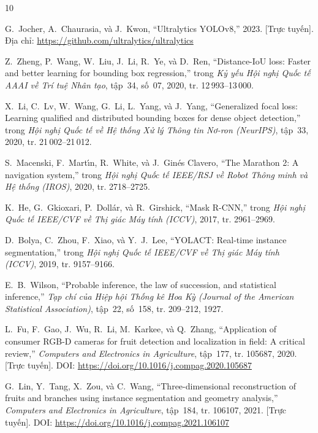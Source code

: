 \documentclass[12pt,a4paper]{article}
\begin{document}
\newpage
\begin{thebibliography}{10}

G.~Jocher, A.~Chaurasia, và J.~Kwon, ``Ultralytics YOLOv8,'' 2023. [Trực tuyến]. Địa chỉ: \url{https://github.com/ultralytics/ultralytics}

Z.~Zheng, P.~Wang, W.~Liu, J.~Li, R.~Ye, và D.~Ren, ``Distance-IoU loss: Faster and better learning for bounding box regression,'' trong \textit{Kỷ yếu Hội nghị Quốc tế AAAI về Trí tuệ Nhân tạo}, tập~34, số~07, 2020, tr. 12\,993--13\,000.

X.~Li, C.~Lv, W.~Wang, G.~Li, L.~Yang, và J.~Yang, ``Generalized focal loss: Learning qualified and distributed bounding boxes for dense object detection,'' trong \textit{Hội nghị Quốc tế về Hệ thống Xử lý Thông tin Nơ-ron (NeurIPS)}, tập~33, 2020, tr. 21\,002--21\,012.

S.~Macenski, F.~Mart{\'\i}n, R.~White, và J.~Gin{\'e}s Clavero, ``The Marathon 2: A navigation system,'' trong \textit{Hội nghị Quốc tế IEEE/RSJ về Robot Thông minh và Hệ thống (IROS)}, 2020, tr. 2718--2725.

K.~He, G.~Gkioxari, P.~Doll{\'a}r, và R.~Girshick, ``Mask R-CNN,'' trong \textit{Hội nghị Quốc tế IEEE/CVF về Thị giác Máy tính (ICCV)}, 2017, tr. 2961--2969.

D.~Bolya, C.~Zhou, F.~Xiao, và Y.~J.~Lee, ``YOLACT: Real-time instance segmentation,'' trong \textit{Hội nghị Quốc tế IEEE/CVF về Thị giác Máy tính (ICCV)}, 2019, tr. 9157--9166.

E.~B.~Wilson, ``Probable inference, the law of succession, and statistical inference,'' \textit{Tạp chí của Hiệp hội Thống kê Hoa Kỳ (Journal of the American Statistical Association)}, tập~22, số~158, tr. 209--212, 1927.

L.~Fu, F.~Gao, J.~Wu, R.~Li, M.~Karkee, và Q.~Zhang, ``Application of consumer RGB-D cameras for fruit detection and localization in field: A critical review,'' \textit{Computers and Electronics in Agriculture}, tập~177, tr. 105687, 2020. [Trực tuyến]. DOI: \url{https://doi.org/10.1016/j.compag.2020.105687}

G.~Lin, Y.~Tang, X.~Zou, và C.~Wang, ``Three-dimensional reconstruction of fruits and branches using instance segmentation and geometry analysis,'' \textit{Computers and Electronics in Agriculture}, tập~184, tr. 106107, 2021. [Trực tuyến]. DOI: \url{https://doi.org/10.1016/j.compag.2021.106107}


\end{thebibliography}
\end{document}
